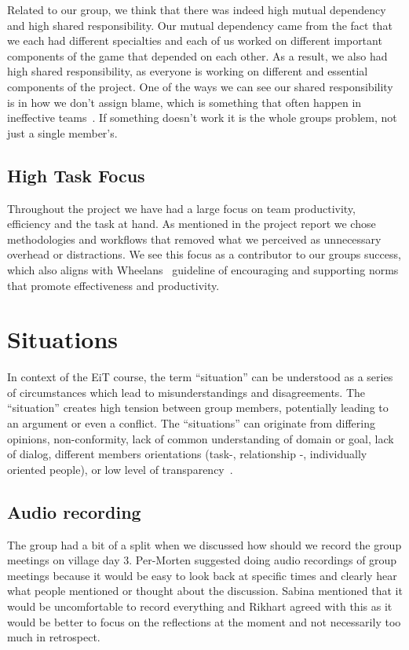 Related to our group, we think that there was indeed high mutual dependency and high shared responsibility. Our mutual dependency came from the fact that we each had different specialties and each of us worked on different important components of the game that depended on each other. As a result, we also had high shared responsibility, as everyone is working on different and essential components of the project. One of the ways we can see our shared responsibility is in how we don’t assign blame, which is something that often happen in ineffective teams~\cite{wheelan}. If something doesn’t work it is the whole groups problem, not just a single member’s.

\subsection{High Task Focus}
Throughout the project we have had a large focus on team productivity, efficiency and the task at hand. As mentioned in the project report we chose methodologies and workflows that removed what we perceived as unnecessary overhead or distractions. We see this focus as a contributor to our groups success, which also aligns with Wheelans~\cite{wheelan} guideline of encouraging and supporting norms that promote effectiveness and productivity. 

\section{Situations}
In context of the EiT course, the term “situation” can be understood as a series of circumstances which lead to misunderstandings and disagreements. The “situation” creates high tension between group members, potentially leading to an argument or even a conflict. The “situations” can originate from differing opinions, non-conformity, lack of common understanding of domain or goal, lack of dialog, different members orientations (task-, relationship -, individually oriented people), or low level of transparency~\cite{ntnu_eit_book}.
\subsection{Audio recording}
The group had a bit of a split when we discussed how should we record the group meetings on village day 3. Per-Morten suggested doing audio recordings of group meetings because it would be easy to look back at specific times and clearly hear what people mentioned or thought about the discussion. Sabina mentioned that it would be uncomfortable to record everything and Rikhart agreed with this as it would be better to focus on the reflections at the moment and not necessarily too much in retrospect.


